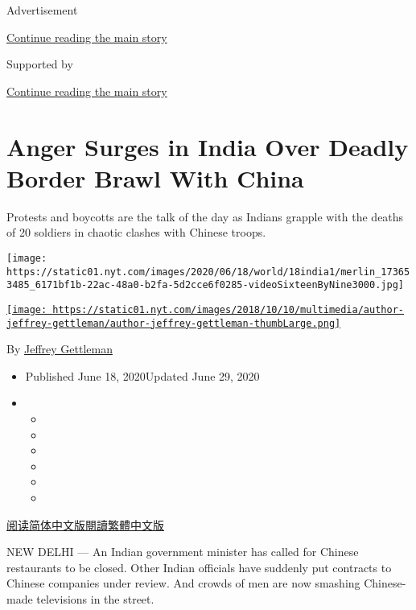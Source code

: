 Advertisement

\protect\hyperlink{after-top}{Continue reading the main story}

Supported by

\protect\hyperlink{after-sponsor}{Continue reading the main story}

\hypertarget{anger-surges-in-india-over-deadly-border-brawl-with-china}{%
\section{Anger Surges in India Over Deadly Border Brawl With
China}\label{anger-surges-in-india-over-deadly-border-brawl-with-china}}

Protests and boycotts are the talk of the day as Indians grapple with
the deaths of 20 soldiers in chaotic clashes with Chinese troops.

\texttt{[image: https://static01.nyt.com/images/2020/06/18/world/18india1/merlin\_173653485\_6171bf1b-22ac-48a0-b2fa-5d2cce6f0285-videoSixteenByNine3000.jpg]}

\href{https://www.nytimes.com/by/jeffrey-gettleman}{\texttt{[image: https://static01.nyt.com/images/2018/10/10/multimedia/author-jeffrey-gettleman/author-jeffrey-gettleman-thumbLarge.png]}}

By \href{https://www.nytimes.com/by/jeffrey-gettleman}{Jeffrey
Gettleman}

\begin{itemize}
\item
  Published June 18, 2020Updated June 29, 2020
\item
  \begin{itemize}
  \item
  \item
  \item
  \item
  \item
  \item
  \end{itemize}
\end{itemize}

\href{https://cn.nytimes.com/world/20200619/india-china-border/}{阅读简体中文版}\href{https://cn.nytimes.com/world/20200619/india-china-border/zh-hant}{閱讀繁體中文版}

NEW DELHI --- An Indian government minister has called for Chinese
restaurants to be closed. Other Indian officials have suddenly put
contracts to Chinese companies under review. And crowds of men are now
smashing Chinese-made televisions in the street.

